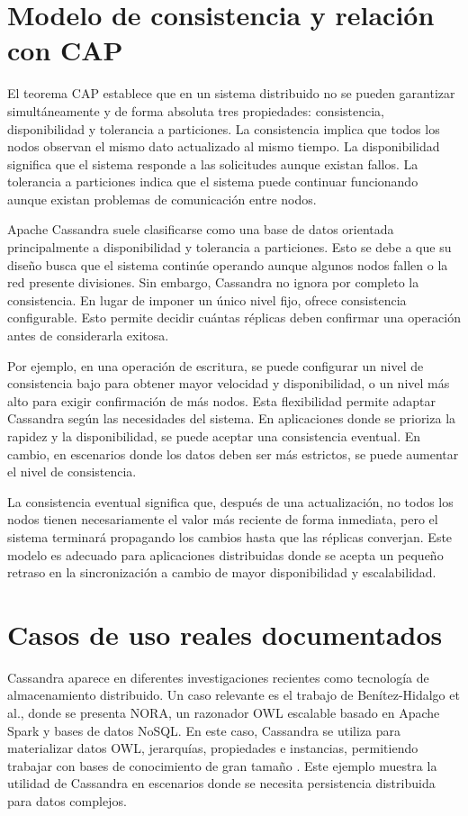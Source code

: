 \documentclass[12pt,a4paper]{article}
\begin{document}
\section{Modelo de consistencia y relación con CAP}

El teorema CAP establece que en un sistema distribuido no se pueden garantizar simultáneamente y de forma absoluta tres propiedades: consistencia, disponibilidad y tolerancia a particiones. La consistencia implica que todos los nodos observan el mismo dato actualizado al mismo tiempo. La disponibilidad significa que el sistema responde a las solicitudes aunque existan fallos. La tolerancia a particiones indica que el sistema puede continuar funcionando aunque existan problemas de comunicación entre nodos.

Apache Cassandra suele clasificarse como una base de datos orientada principalmente a disponibilidad y tolerancia a particiones. Esto se debe a que su diseño busca que el sistema continúe operando aunque algunos nodos fallen o la red presente divisiones. Sin embargo, Cassandra no ignora por completo la consistencia. En lugar de imponer un único nivel fijo, ofrece consistencia configurable. Esto permite decidir cuántas réplicas deben confirmar una operación antes de considerarla exitosa.

Por ejemplo, en una operación de escritura, se puede configurar un nivel de consistencia bajo para obtener mayor velocidad y disponibilidad, o un nivel más alto para exigir confirmación de más nodos. Esta flexibilidad permite adaptar Cassandra según las necesidades del sistema. En aplicaciones donde se prioriza la rapidez y la disponibilidad, se puede aceptar una consistencia eventual. En cambio, en escenarios donde los datos deben ser más estrictos, se puede aumentar el nivel de consistencia.

La consistencia eventual significa que, después de una actualización, no todos los nodos tienen necesariamente el valor más reciente de forma inmediata, pero el sistema terminará propagando los cambios hasta que las réplicas converjan. Este modelo es adecuado para aplicaciones distribuidas donde se acepta un pequeño retraso en la sincronización a cambio de mayor disponibilidad y escalabilidad.

\section{Casos de uso reales documentados}

Cassandra aparece en diferentes investigaciones recientes como tecnología de almacenamiento distribuido. Un caso relevante es el trabajo de Benítez-Hidalgo et al., donde se presenta NORA, un razonador OWL escalable basado en Apache Spark y bases de datos NoSQL. En este caso, Cassandra se utiliza para materializar datos OWL, jerarquías, propiedades e instancias, permitiendo trabajar con bases de conocimiento de gran tamaño \cite{benitez2023}. Este ejemplo muestra la utilidad de Cassandra en escenarios donde se necesita persistencia distribuida para datos complejos.
\end{document}
